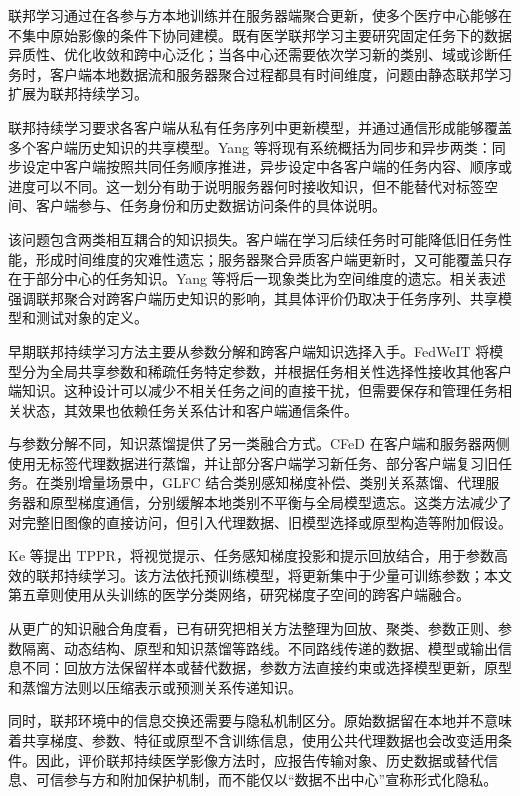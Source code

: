 联邦学习通过在各参与方本地训练并在服务器端聚合更新，使多个医疗中心能够在不集中原始影像的条件下协同建模\cite{mcmahan2017fedavg,rieke2020future,sheller2020federated}。既有医学联邦学习主要研究固定任务下的数据异质性、优化收敛和跨中心泛化；当各中心还需要依次学习新的类别、域或诊断任务时，客户端本地数据流和服务器聚合过程都具有时间维度，问题由静态联邦学习扩展为联邦持续学习。

联邦持续学习要求各客户端从私有任务序列中更新模型，并通过通信形成能够覆盖多个客户端历史知识的共享模型。Yang 等将现有系统概括为同步和异步两类：同步设定中客户端按照共同任务顺序推进，异步设定中各客户端的任务内容、顺序或进度可以不同\cite{yang2024fclsurvey}。这一划分有助于说明服务器何时接收知识，但不能替代对标签空间、客户端参与、任务身份和历史数据访问条件的具体说明。

该问题包含两类相互耦合的知识损失。客户端在学习后续任务时可能降低旧任务性能，形成时间维度的灾难性遗忘；服务器聚合异质客户端更新时，又可能覆盖只存在于部分中心的任务知识。Yang 等将后一现象类比为空间维度的遗忘\cite{yang2024fclsurvey}。相关表述强调联邦聚合对跨客户端历史知识的影响，其具体评价仍取决于任务序列、共享模型和测试对象的定义。

早期联邦持续学习方法主要从参数分解和跨客户端知识选择入手。FedWeIT 将模型分为全局共享参数和稀疏任务特定参数，并根据任务相关性选择性接收其他客户端知识\cite{yoon2021fedweit}。这种设计可以减少不相关任务之间的直接干扰，但需要保存和管理任务相关状态，其效果也依赖任务关系估计和客户端通信条件。

与参数分解不同，知识蒸馏提供了另一类融合方式。CFeD 在客户端和服务器两侧使用无标签代理数据进行蒸馏，并让部分客户端学习新任务、部分客户端复习旧任务\cite{ma2022cfed}。在类别增量场景中，GLFC 结合类别感知梯度补偿、类别关系蒸馏、代理服务器和原型梯度通信，分别缓解本地类别不平衡与全局模型遗忘\cite{dong2022glfc}。这类方法减少了对完整旧图像的直接访问，但引入代理数据、旧模型选择或原型构造等附加假设。

Ke 等提出 TPPR，将视觉提示、任务感知梯度投影和提示回放结合，用于参数高效的联邦持续学习\cite{ke2025tppr}。该方法依托预训练模型，将更新集中于少量可训练参数；本文第五章则使用从头训练的医学分类网络，研究梯度子空间的跨客户端融合。

从更广的知识融合角度看，已有研究把相关方法整理为回放、聚类、参数正则、参数隔离、动态结构、原型和知识蒸馏等路线\cite{yang2024fclsurvey}。不同路线传递的数据、模型或输出信息不同：回放方法保留样本或替代数据，参数方法直接约束或选择模型更新，原型和蒸馏方法则以压缩表示或预测关系传递知识。

同时，联邦环境中的信息交换还需要与隐私机制区分。原始数据留在本地并不意味着共享梯度、参数、特征或原型不含训练信息，使用公共代理数据也会改变适用条件\cite{rieke2020future,yang2024fclsurvey}。因此，评价联邦持续医学影像方法时，应报告传输对象、历史数据或替代信息、可信参与方和附加保护机制，而不能仅以“数据不出中心”宣称形式化隐私。

